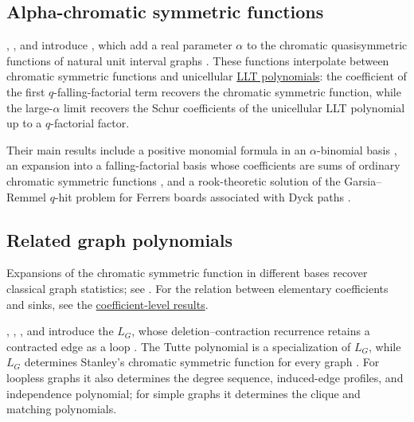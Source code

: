 \subsection[alphaChromaticSymmetric]{Alpha-chromatic symmetric functions}

, , and 
introduce \label{alphaChromaticSymmetricFunction},
which add a
real parameter $\alpha$ to the chromatic quasisymmetric functions of
natural unit interval graphs \cite{HaglundOhYoo2025}.  These functions
interpolate between chromatic symmetric functions and unicellular
\hyperref[unicellularLLT]{LLT polynomials}: the coefficient of the first
$q$-falling-factorial term recovers the chromatic symmetric function, while
the large-$\alpha$ limit recovers the Schur coefficients of the
unicellular LLT polynomial up to a $q$-factorial factor.

Their main results include a positive monomial formula in an
$\alpha$-binomial basis \cite[Thm.~3.1]{HaglundOhYoo2025}, an expansion
into a falling-factorial basis whose coefficients are sums of ordinary
chromatic symmetric functions \cite[Thm.~4.4]{HaglundOhYoo2025}, and a
rook-theoretic solution of the Garsia--Remmel $q$-hit problem for Ferrers
boards associated with Dyck paths \cite[Cor.~6.3]{HaglundOhYoo2025}.


\subsection[chromaticGraphInvariants]{Related graph polynomials}

Expansions of the chromatic symmetric function in different bases recover
classical graph statistics; see \cite{ChanCrew2023}. For the relation between
elementary coefficients and sinks, see the
\hyperref[chromaticEExpansionCoefficientTests]{coefficient-level results}.

, , , and
 introduce the  $L_G$, whose
deletion--contraction recurrence retains a contracted edge as a loop
\cite{KirillovNenashevShapiroVaintrob2026x}.  The Tutte polynomial is a
specialization of $L_G$, while $L_G$ determines Stanley's chromatic
symmetric function for every graph
\cite[Cor.~2.6 and Thm.~5.4]{KirillovNenashevShapiroVaintrob2026x}.
For loopless graphs it also determines the degree sequence, induced-edge
profiles, and independence polynomial; for simple graphs it determines the
clique and matching polynomials.

